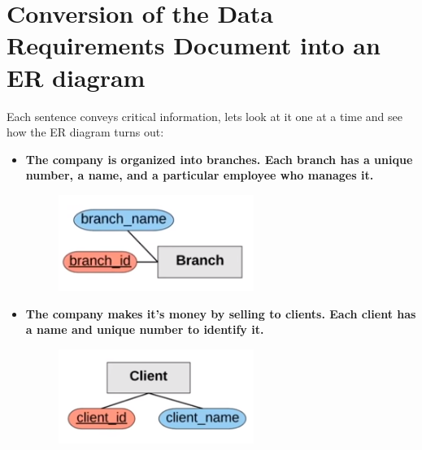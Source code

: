 \section{Conversion of the Data Requirements Document into an ER diagram}
Each sentence conveys critical information, lets look at it one at a time and see how the ER diagram turns out:
\begin{itemize}
    \item \textbf{The company is organized into branches. Each branch has a unique number, a name, and a particular employee who manages it.}
        \begin{figure}[H]
            \centering
            \includegraphics[width=0.6\textwidth]{./Figs/2020-12-24-00-13-51.png}
        \end{figure}
    
    \item \textbf{The company makes it's money by selling to clients. Each client has a name and unique number to identify it.}
        \begin{figure}[H]
            \centering
            \includegraphics[width=0.6\textwidth]{./Figs/2020-12-24-00-14-18.png}
        \end{figure}
    

\end{itemize}
